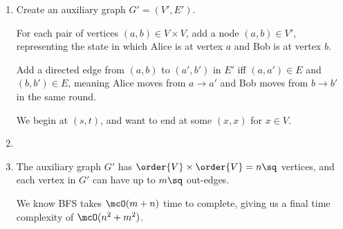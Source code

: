 \documentclass{article}
\begin{document}
\begin{solution}

\begin{enumerate}[label=(\alph*)]
  \item Create an auxiliary graph \( G' = (V', E') \).

  For each pair of vertices \( (a,b) \in V \times V \), add a node \( (a,b) \in V' \), representing the state in which Alice is at vertex \( a \) and Bob is at vertex \( b \).

  Add a directed edge from \( (a,b) \) to \( (a',b') \) in \( E' \) iff \( (a, a') \in E \) and \( (b, b') \in E \), meaning Alice moves from \( a \to a' \) and Bob moves from \( b \to b' \) in the same round.

  We begin at \( (s,t) \), and want to end at some \( (x, x) \) for \( x\in V \).

  \item {}

  \item The auxiliary graph \( G' \) has \( \order{V}\times\order{V}=n\sq \) vertices, and each vertex in \( G' \) can have up to \( m\sq \) out-edges.

  We know BFS takes \( \mcO(m+n) \) time to complete, giving us a final time complexity of \( \mcO(n^2 + m^2) \).
\end{enumerate}
\end{solution}
\pagebreak
\end{document}
